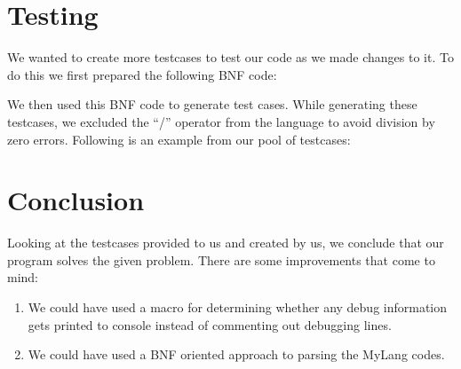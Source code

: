 \documentclass[12pt,a4paper]{article}
\begin{document}
\section{Testing}
We wanted to create more testcases to test our code as we made changes to it. To do this we first prepared the following BNF code:



We then used this BNF code to generate test cases. While generating these testcases, we excluded the “/” operator from the language to avoid division by zero errors. Following is an example from our pool of testcases:



\section{Conclusion}

Looking at the testcases provided to us and created by us, we conclude that our program solves the given problem. There are some improvements that come to mind:

\begin{enumerate}
    \item We could have used a macro for determining whether any debug information gets printed to console instead of commenting out debugging lines.
    \item We could have used a BNF oriented approach to parsing the MyLang codes.
\end{enumerate}
\end{document}
